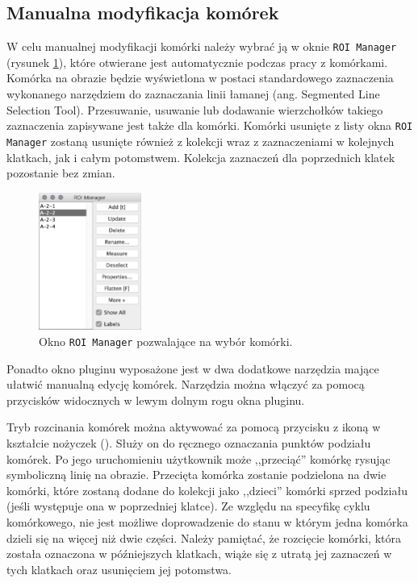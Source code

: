 \documentclass[declaration,shortabstract,mgr]{iithesis}
\begin{document}
\subsection{Manualna modyfikacja komórek}
\label{sec:user-manual-modifications}

W celu manualnej modyfikacji komórki należy wybrać ją w oknie \texttt{ROI Manager} (rysunek \ref{fig:ui-roi-manager}), które otwierane jest automatycznie podczas pracy z komórkami.
Komórka na obrazie będzie wyświetlona w postaci standardowego zaznaczenia wykonanego narzędziem do zaznaczania linii łamanej (ang. Segmented Line Selection Tool)\cite{imagej:segmented-line}.
Przesuwanie, usuwanie lub dodawanie wierzchołków takiego zaznaczenia zapisywane jest także dla komórki.
Komórki usunięte z listy okna \texttt{ROI Manager} zostaną usunięte również z kolekcji wraz z zaznaczeniami w kolejnych klatkach, jak i całym potomstwem.
Kolekcja zaznaczeń dla poprzednich klatek pozostanie bez zmian.

\begin{figure}
  \centering
  \includegraphics[width=0.3\textwidth]{images/ui-roi-manager.png}
  \caption{Okno \texttt{ROI Manager} pozwalające na wybór komórki.}
  \label{fig:ui-roi-manager}
\end{figure}

Ponadto okno pluginu wyposażone jest w dwa dodatkowe narzędzia mające ułatwić manualną edycję komórek. Narzędzia można włączyć za pomocą przycisków widocznych w lewym dolnym rogu okna pluginu.

Tryb rozcinania komórek można aktywować za pomocą przycisku z ikoną w kształcie nożyczek ().
Służy on do ręcznego oznaczania punktów podziału komórek. Po jego uruchomieniu użytkownik może ,,przeciąć'' komórkę rysując symboliczną linię na obrazie.
Przecięta komórka zostanie podzielona na dwie komórki, które zostaną dodane do kolekcji jako ,,dzieci'' komórki sprzed podziału (jeśli występuje ona w poprzedniej klatce).
Ze względu na specyfikę cyklu komórkowego, nie jest możliwe doprowadzenie do stanu w którym jedna komórka dzieli się na więcej niż dwie części.
Należy pamiętać, że rozcięcie komórki, która została oznaczona w późniejszych klatkach, wiąże się z utratą jej zaznaczeń w tych klatkach oraz usunięciem jej potomstwa.
\end{document}
